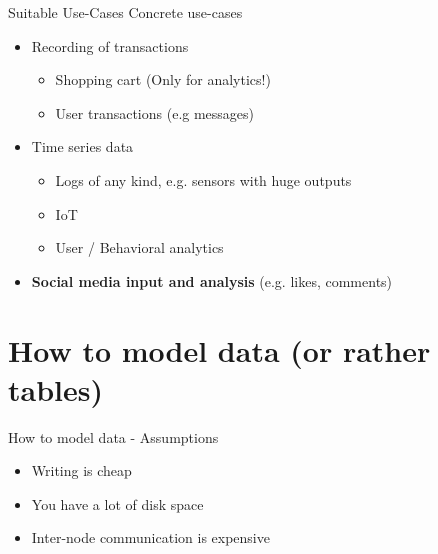 \documentclass[
  10pt
]{beamer}
\begin{document}
\begin{frame}{Suitable Use-Cases \cite{netflix, apple, ebay}}
  Concrete use-cases
  \begin{itemize}
    \item<1-> Recording of transactions
      \begin{itemize}
        \item Shopping cart (Only for analytics!)
        \item User transactions (e.g messages)
      \end{itemize}
    \item<2-> Time series data
      \begin{itemize}
        \item Logs of any kind, e.g. sensors with huge outputs
        \item IoT
        \item User / Behavioral analytics
      \end{itemize}
    \item<3-> \textbf{Social media input and analysis} (e.g. likes, comments)
  \end{itemize}


\end{frame}

\section{How to model data (or rather tables)}  %

\begin{frame}{How to model data - Assumptions \cite{hobbs_datamodeling, guru99_modeling}}
  \begin{itemize}
    \item Writing is cheap
    \item You have a lot of disk space
    \item Inter-node communication is expensive
  \end{itemize}
\end{frame}
\end{document}
